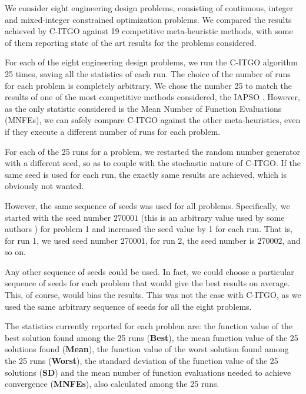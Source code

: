 \begin{revAns}
We consider eight engineering design problems, consisting of continuous, integer and mixed-integer constrained optimization problems. We compared the results achieved by C-ITGO against 19 competitive meta-heuristic methods, with some of them reporting state of the art results for the problems considered.

For each of the eight engineering design problems, we run the C-ITGO algorithm 25 times, saving all the statistics of each run. The choice of the number of runs for each problem is completely arbitrary. We chose the number 25 to match the results of one of the most competitive methods considered, the IAPSO \cite{IAPSO}. However, as the only statistic considered is the Mean Number of Function Evaluations (MNFEs), we can safely compare C-ITGO against the other meta-heuristics, even if they execute a different number of runs for each problem.

For each of the 25 runs for a problem, we restarted the random number generator with a different seed, so as to couple with the stochastic nature of C-ITGO. If the same seed is used for each run, the exactly same results are achieved, which is obviously not wanted.

However, the same sequence of seeds was used for all problems. Specifically, we started with the seed number $270001$ (this is an arbitrary value used by some authors \cite{BRKGABB}) for problem 1 and increased the seed value by 1 for each run. That is, for run 1, we used seed number 270001, for run 2, the seed number is 270002, and so on.

Any other sequence of seeds could be used. In fact, we could choose a particular sequence of seeds for each problem that would give the best results on average. This, of course, would bias the results. This was not the case with C-ITGO, as we used the same arbitrary sequence of seeds for all the eight problems.

The statistics currently reported for each problem are: the function value of the best solution found among the 25 runs (\textbf{Best}), the mean function value of the 25 solutions found (\textbf{Mean}), the function value of the worst solution found among the 25 runs (\textbf{Worst}), the standard deviation of the function value of the 25 solutions (\textbf{SD}) and the mean number of function evaluations needed to achieve convergence (\textbf{MNFEs}), also calculated among the 25 runs.



\end{revAns}
